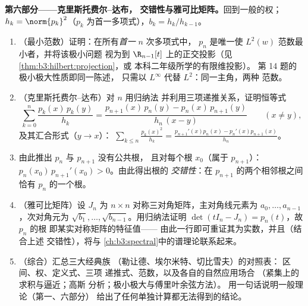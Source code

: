 \begin{problem}
\medskip
\noindent\textbf{第六部分——克里斯托费尔--达布，
交错性与雅可比矩阵。}回到一般的权；
$h_k = \norm{p_k}^2$（$p_k$ 为首一多项式），$b_k = h_k/h_{k-1}$。
\begin{enumerate}[resume]
  \item （最小范数）证明：在所有\emph{首一}
        $n$ 次多项式中， $p_n$
        是唯一使 $L^2(w)$ 范数最小者，并将该极小问题
        视为到
        $\R_{n-1}[t]$ 上的正交投影（见\cref{thm:b3:hilbert:projection}，或
        本科二年级所学的有限维投影）。
        第 14 题的极小极大性质即同一陈述，
        只需以 $L^\infty$ 代替 $L^2$：同一主角，两种
        范数。
  \item （克里斯托费尔--达布）对 $n$ 用归纳法
        并利用三项递推关系，证明恒等式
        \[
        \sum_{k=0}^{n}\frac{p_k(x)\,p_k(y)}{h_k}
        = \frac{p_{n+1}(x)\,p_n(y) -
        p_n(x)\,p_{n+1}(y)}{h_n\,(x - y)}
        \qquad (x \neq y),
        \]
        及其汇合形式（$y \to x$）：
        $\sum_{k\leq n}\frac{p_k(x)^2}{h_k} =
        \frac{p_{n+1}'(x)p_n(x) - p_n'(x)p_{n+1}(x)}{h_n}$。
  \item 由此推出 $p_n$ 与 $p_{n+1}$ 没有公共根，
        且对每个根 $x_0$（属于 $p_{n+1}$）：
        $p_n(x_0)\,p_{n+1}'(x_0) > 0$。由此得出根的
        \emph{交错性}：在 $p_{n+1}$ 的两个相邻根之间
        恰有 $p_n$ 的一个根。
  \item （雅可比矩阵）设 $J_n$ 为 $n\times n$
        对称三对角矩阵，主对角线元素为 $a_0,
        \dots, a_{n-1}$，次对角元为 $\sqrt{b_1},
        \dots, \sqrt{b_{n-1}}$。用归纳法证明
        $\det(tI_n - J_n) = p_n(t)$，故 $p_n$ 的根
        即某实对称矩阵的特征值——
        由此一行即可重证其为实数，并且（结合上述
        交错性），将与
        \cref{ch:b3:spectral}中的谱理论联系起来。
  \item （综合）汇总三大经典族
        （勒让德、埃尔米特、切比雪夫）的对照表：
        区间、权、定义式、三项
        递推式、范数，以及各自的自然应用场合
        （紧集上的求积与逼近；高斯
        分析；极小极大与傅里叶余弦方法）。
        用一句话说明一般理论（第一、六部分）
        给出了任何单独计算都无法得到的结论。
\end{enumerate}


\end{problem}
